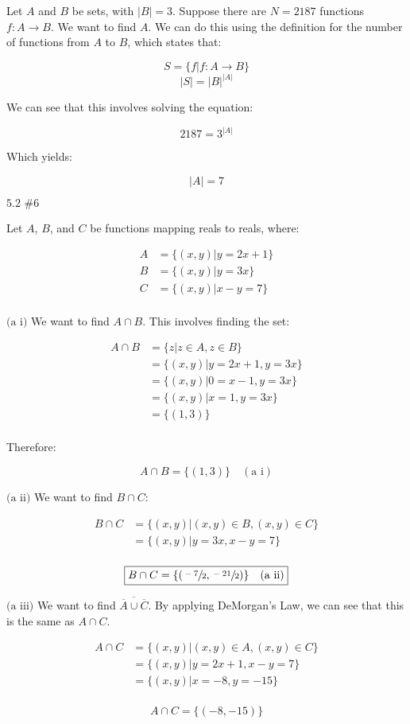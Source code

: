 \documentclass{article}
\newcommand{\problem}[2]{$\boxed{\text{#1 \##2}}$}
\newcommand{\subproblem}[1]{$\boxed{\text{(#1)}}$}
\newcommand{\subsolution}[2]{\boxed{#2\quad(\text{#1})}}
\newcommand{\solution}[1]{\boxed{#1}}
\newcommand{\multistep}[1]{\begin{array}{rl} #1 \end{array}}
\newcommand{\conj}[1]{\overline{#1}}
\begin{document}
Let $A$ and $B$ be sets, with $|B|=3$. Suppose there are $N=2187$
functions $f:A\rightarrow{}B$. We want to find $A$. We can do this
using the definition for the number of functions from $A$ to $B$,
which states that:

\[
S=\{ f|f:A\rightarrow B \}
\] \[
|S|=|B|^{|A|}
\]

We can see that this involves solving the equation:

\[
2187=3^{|A|}
\]

Which yields:

\[
\solution{|A|=7}
\]

%
\problem{5.2}{6}

Let $A$, $B$, and $C$ be functions mapping reals to reals, where:

\[
\multistep{
A&=\{(x,y)|y=2x+1\} \\
B&=\{(x,y)|y=3x\} \\
C&=\{(x,y)|x-y=7\} \\
}
\]

%
\subproblem{a i} We want to find $A\cap{}B$. This involves finding the
set:

\[
\multistep{
A\cap B&=\{z|z\in A, z\in B\} \\
&=\{(x,y)|y=2x+1, y=3x\} \\
&=\{(x,y)|0=x-1, y=3x\} \\
&=\{(x,y)|x=1, y=3x\} \\
&=\{(1,3)\} \\
}
\]

Therefore:

\[
\subsolution{a i}{A\cap B=\{(1,3)\}}
\]

%
\subproblem{a ii} We want to find $B\cap{}C$:

\[
\multistep{
B\cap C&=\{(x,y)|(x,y)\in B, (x,y)\in C\} \\
&=\{(x,y)|y=3x, x-y=7\} \\
}
\]

\[
\subsolution{a ii}{B\cap C=\{(\sfrac{-7}{2}, \sfrac{-21}{2})\}}
\]

%
\subproblem{a iii} We want to find $\conj{\conj{A}\cup\conj{C}}$. By
applying DeMorgan's Law, we can see that this is the same as
$A\cap{}C$.

\[
\multistep{
A\cap C&=\{(x,y)|(x,y)\in A, (x,y)\in C\} \\
&=\{(x,y)|y=2x+1, x-y=7\} \\
&=\{(x,y)|x=-8, y=-15\} \\
}
\]

\[
\solution{A\cap C=\{(-8,-15)\}}
\]
\end{document}
